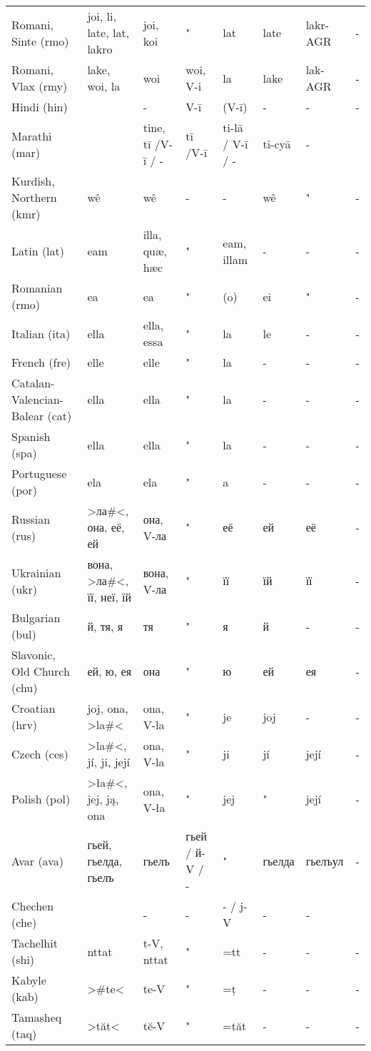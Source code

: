\begin{landscape}
\begin{longtable}{*{8}{l}}
Romani, Sinte (rmo)	&	joi, li, late, lat, {lakro}	&	joi, koi	&	"	&	lat	&	late	&	lakr-AGR	&	 -	\\
Romani, Vlax (rmy)	&	lake, woi, la	&	woi	&	woi, V-i	&	la	&	lake	&	lak-AGR	&	 -	\\
Hindi (hin)	&		&	 -	&	V-ī	&	(V-ī)	&	 -	&	 -	&	 -	\\
Marathi (mar)	&\textdevanagari{तिला, ती, तिने}&	tine, tī /V-ī / -	&	tī /V-ī	&	ti-lā / V-ī / -	&	ti-cyā	&	 -	&		\\
Kurdish, Northern (kmr)	&	wê	&	wê	&	 -	&	 -	&	wê	&	"	&	 -	\\
Latin (lat)	&	eam	&	illa, quæ, hæc	&	"	&	eam, illam	&	 -	&	 -	&	 -	\\
Romanian (rmo)	&	ea	&	ea	&	"	&	(o)	&	ei	&	"	&	 -	\\
Italian (ita)	&	ella	&	ella, essa	&	"	&	la	&	 le	&	 -	&	 -	\\
French (fre)	&	elle	&	elle	&	"	&	la	&	 -	&	 -	&	 -	\\
Catalan-Valencian-Balear (cat)	&	ella	&	ella	&	"	&	la	&	 -	&	 -	&	 -	\\
Spanish (spa)	&	ella	&	ella	&	"	&	la	&	 -	&	 -	&	 -	\\
Portuguese (por)	&	ela	&	ela	&	"	&	a	&	 -	&	 -	&	 -	\\
Russian (rus)	&	>ла\#<, она, её, ей	&	она, V-ла	&	"	&	её	&	ей	&	её	&	 -	\\
Ukrainian (ukr)	&	вона, >ла\#<, її, неї, {їй}	&	вона, V-ла	&	"	&	її	&	їй	&	її 	&	 -	\\
Bulgarian (bul)	&	й, тя, я	&	тя 	&	"	&	я 	&	й	&	 -	&	 -	\\
Slavonic, Old Church (chu)	&	ей, ю, ея	&	она	&	"	&	ю 	&	ей	&	ея	&	 -	\\
Croatian (hrv)	&	joj, ona, {>la\#<}	&	ona, V-la	&	"	&	je	&	joj	&	 -	&	 -	\\
Czech (ces)	&	>la\#<, jí, {ji, její}	&	ona, V-la	&	"	&	ji	&	jí	&	její	&	 -	\\
Polish (pol)	&	>ła\#<, jej, ją, {ona}	&	ona, V-ła	&	"	&	jej	&	"	&	její	&	 -	\\
Avar (ava)	&	гьей, гьелда, гьелъ	&	гьелъ	&	гьей / й-V / -	&	"	&	гьелда 	&	гьелъул 	&	 -	\\
Chechen (che)	&		&	 -	&	 -	&	 - / j-V	&	 -	&	 -	&		\\
Tachelhit (shi)	&	nttat	&	t-V, nttat	&	"	&	 =tt	&	 -	&	 -	&	 -	\\
Kabyle (kab)	&	{>\#te<}	&	te-V	&	"	&	 =ț	&	 -	&	 -	&	 -	\\
Tamasheq (taq)	&	>tăt<	&	tĕ-V	&	"	&	 =tăt 	&	 -	&	 -	&	 -	\\

\end{longtable}
\end{landscape}
